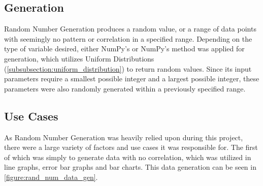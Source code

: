 \subsection{Generation}
Random Number Generation produces a random value, or a range of data points with seemingly no pattern or correlation in a specified range. Depending on the type of variable desired, either NumPy's  or NumPy's  method was applied for generation, which utilizes Uniform Distributions (\autoref{subsubsection:uniform_distribution}) to return random values. Since its input parameters require a smallest possible integer and a largest possible integer, these parameters were also randomly generated within a previously specified range.

\subsection{Use Cases}
As Random Number Generation was heavily relied upon during this project, there were a large variety of factors and use cases it was responsible for. The first of which was simply to generate data with no correlation, which was utilized in line graphs, error bar graphs and bar charts. This data generation can be seen in \autoref{figure:rand_num_data_gen}.

\hfill

